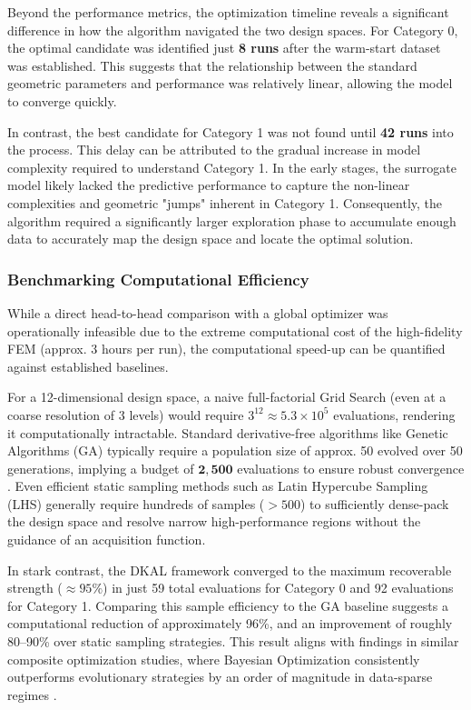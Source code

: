 \documentclass[
  preprint,
  12pt,
  a4paper
]{elsarticle}
\newcommand{\new}[1]{#1}
\begin{document}
Beyond the performance metrics, the optimization timeline reveals a significant difference in how the algorithm navigated the two design spaces. For Category 0, the optimal candidate was identified just \textbf{8 runs} after the \new{warm-start dataset} was established. This suggests that the relationship between the standard geometric parameters and performance was relatively linear, allowing the model to converge quickly.

In contrast, the best candidate for Category 1 was not found until \textbf{42 runs} into the process. This delay can be attributed to the gradual increase in model complexity required to understand Category 1. In the early stages, the surrogate model likely lacked the predictive performance to capture the non-linear complexities and geometric "jumps" inherent in Category 1. Consequently, the algorithm required a significantly larger exploration phase to accumulate enough data to accurately map the design space and locate the optimal solution.

\subsubsection{Benchmarking Computational Efficiency}
While a direct head-to-head comparison with a global optimizer was operationally infeasible due to the extreme computational cost of the high-fidelity FEM (approx. 3 hours per run), the \new{computational speed-up} can be quantified against established baselines. 

For a 12-dimensional design space, a naive full-factorial Grid Search (even at a coarse resolution of 3 levels) would require $3^{12} \approx 5.3 \times 10^5$ evaluations, rendering it computationally intractable. Standard derivative-free algorithms like Genetic Algorithms (GA) typically require a population size of approx. 50 evolved over 50 generations, implying a budget of $\mathbf{2,500}$ evaluations to ensure robust convergence \cite{queipo2005surrogate}. Even efficient static sampling methods such as Latin Hypercube Sampling (LHS) generally require hundreds of samples ($>500$) to sufficiently dense-pack the design space and resolve narrow high-performance regions without the guidance of an acquisition function.

In stark contrast, the \new{DKAL framework} converged to the maximum recoverable strength ($\approx 95\%$) in just 59 total evaluations for Category 0 and 92 evaluations for Category 1. Comparing this sample efficiency to the GA baseline suggests a computational reduction of approximately 96\%, and an improvement of roughly 80--90\% over static sampling strategies. This result aligns with findings in similar composite optimization studies, where Bayesian Optimization consistently outperforms evolutionary strategies by an order of magnitude in data-sparse regimes \cite{ghosh2023digital}.
\end{document}
